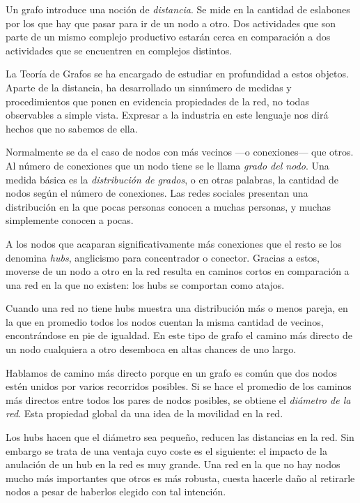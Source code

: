 \documentclass[a4paper]{report}
\begin{document}
Un grafo introduce una noción de \textit{distancia}. Se mide en la cantidad de eslabones por los que hay que pasar para ir de un nodo a otro. Dos actividades que son parte de un mismo complejo productivo estarán cerca en comparación a dos actividades que se encuentren en complejos distintos.

La Teoría de Grafos se ha encargado de estudiar en profundidad a estos objetos. Aparte de la distancia, ha desarrollado un sinnúmero de medidas y procedimientos que ponen en evidencia propiedades de la red, no todas observables a simple vista. Expresar a la industria en este lenguaje nos dirá hechos que no sabemos de ella.

Normalmente se da el caso de nodos con más vecinos —o conexiones— que otros. Al número de conexiones que un nodo tiene se le llama \textit{grado del nodo}. Una medida básica es la \textit{distribución de grados}, o en otras palabras, la cantidad de nodos según el número de conexiones. Las redes sociales presentan una distribución en la que pocas personas conocen a muchas personas, y muchas simplemente conocen a pocas.

A los nodos que acaparan significativamente más conexiones que el resto se los denomina \textit{hubs}, anglicismo para concentrador o conector. Gracias a estos, moverse de un nodo a otro en la red resulta en caminos cortos en comparación a una red en la que no existen: los hubs se comportan como atajos.

Cuando una red no tiene hubs muestra una distribución más o menos pareja, en la que en promedio todos los nodos cuentan la misma cantidad de vecinos, encontrándose en pie de igualdad. En este tipo de grafo el camino más directo de un nodo cualquiera a otro desemboca en altas chances de uno largo.

Hablamos de camino más directo porque en un grafo es común que dos nodos estén unidos por varios recorridos posibles. Si se hace el promedio de los caminos más directos entre todos los pares de nodos posibles, se obtiene el \textit{diámetro de la red}. Esta propiedad global da una idea de la movilidad en la red.

Los hubs hacen que el diámetro sea pequeño, reducen las distancias en la red. Sin embargo se trata de una ventaja cuyo coste es el siguiente: el impacto de la anulación de un hub en la red es muy grande. Una red en la que no hay nodos mucho más importantes que otros es más robusta, cuesta hacerle daño al retirarle nodos a pesar de haberlos elegido con tal intención.
\end{document}
